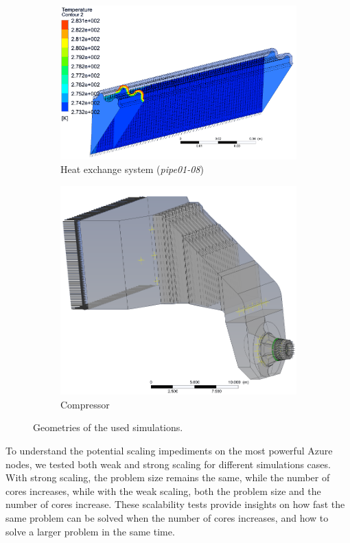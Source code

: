 \documentclass[3p,times]{elsarticle}
\begin{document}
\begin{figure}
\centering
\begin{subfigure}{.4\textwidth}
	\centering
	\includegraphics[width=\linewidth]{pipe_nobg}	
	\caption{Heat exchange system (\textit{pipe01-08})}
 	\label{fig:pipe}
\end{subfigure}
\begin{subfigure}{.5\textwidth}
	\centering
	\includegraphics[width=.7\linewidth]{compressor_nobg}
	\caption{Compressor}
	\label{fig:compressor}
\end{subfigure}

\caption{Geometries of the used simulations.}
\label{fig:geometries}
\end{figure}

To understand the potential scaling impediments on the most powerful Azure nodes, we tested both weak and strong scaling for different simulations cases. With strong scaling, the problem size remains the same, while the number of cores increases, while with the weak scaling, both the problem size and the number of cores increase. These scalability tests provide insights on how fast the same problem can be solved when the number of cores increases, and how to solve a larger problem in the same time. 
\end{document}

